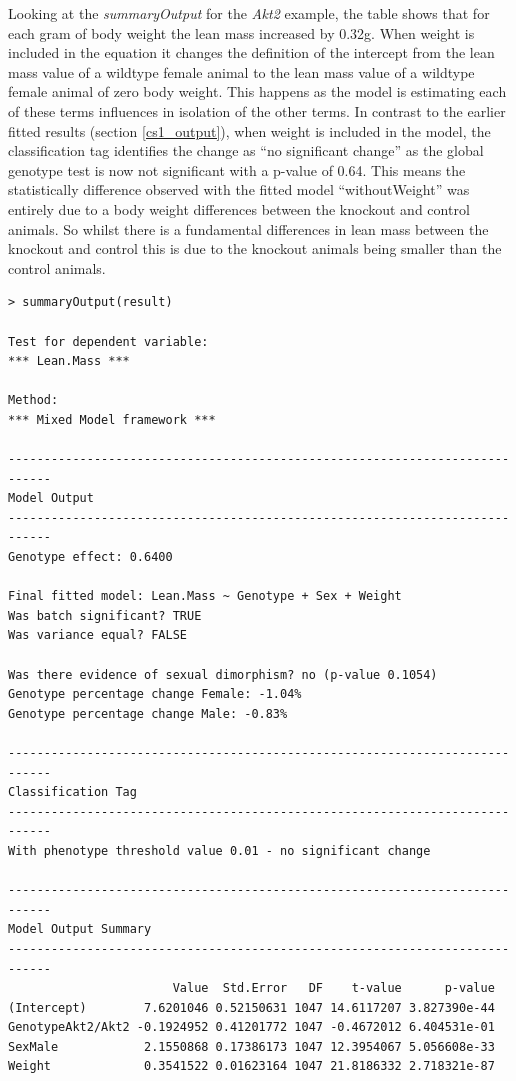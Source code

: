 \documentclass[12pt,a4paper]{article}
\begin{document}
Looking at the \textit{summaryOutput} for the \textit{Akt2} example, the table shows that for each gram of body weight the lean mass increased by 0.32g.  
When weight is included in the equation it changes the definition of the intercept from the lean mass value of a wildtype female animal to the lean mass value of a wildtype female animal of zero body weight. 
This happens as the model is estimating each of these terms influences in isolation of the other terms. 
In contrast to the earlier fitted results (section \ref{cs1_output}), when weight is included in the model, the classification tag identifies the change as “no significant change” 
as the global genotype test is now not significant with a p-value of 0.64.  
This means the statistically difference observed with the fitted model “withoutWeight” was entirely due to a body weight differences between the knockout and control animals.  
So whilst there is a fundamental differences in lean mass between the knockout and control this is due to the knockout animals being smaller than the control animals. 

\begingroup
    \fontsize{8pt}{12pt}\selectfont
\begin{verbatim}
> summaryOutput(result)

Test for dependent variable:
*** Lean.Mass ***

Method:
*** Mixed Model framework ***

----------------------------------------------------------------------------
Model Output
----------------------------------------------------------------------------
Genotype effect: 0.6400

Final fitted model: Lean.Mass ~ Genotype + Sex + Weight
Was batch significant? TRUE
Was variance equal? FALSE

Was there evidence of sexual dimorphism? no (p-value 0.1054)
Genotype percentage change Female: -1.04%
Genotype percentage change Male: -0.83%

----------------------------------------------------------------------------
Classification Tag
----------------------------------------------------------------------------
With phenotype threshold value 0.01 - no significant change

----------------------------------------------------------------------------
Model Output Summary
----------------------------------------------------------------------------
                       Value  Std.Error   DF    t-value      p-value
(Intercept)        7.6201046 0.52150631 1047 14.6117207 3.827390e-44
GenotypeAkt2/Akt2 -0.1924952 0.41201772 1047 -0.4672012 6.404531e-01
SexMale            2.1550868 0.17386173 1047 12.3954067 5.056608e-33
Weight             0.3541522 0.01623164 1047 21.8186332 2.718321e-87
\end{verbatim}
\endgroup
\end{document}
